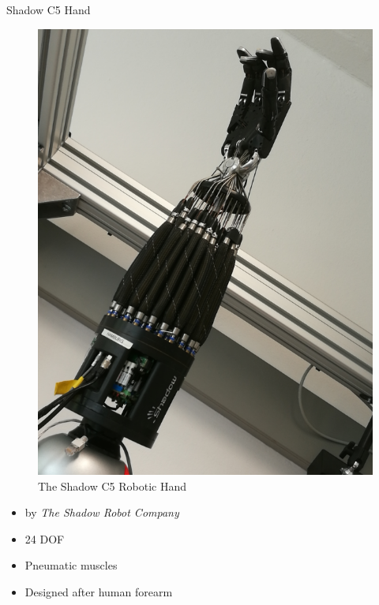 \documentclass[t]{beamer}
\begin{document}
\begin{frame}{Shadow C5 Hand}
\begin{minipage}{0.3\linewidth}
\begin{figure}
	\includegraphics[width=\linewidth]{assets/chpt_basics/hand.png}
	\caption{The Shadow C5 Robotic Hand}
\end{figure}
\end{minipage}
\begin{minipage}{0.68\linewidth}
	\begin{itemize}
		\item by \textit{The Shadow Robot Company} \cite{web:robothand:spec}
		\item 24 DOF
		\item Pneumatic muscles
		\item Designed after human forearm
	\end{itemize}
\end{minipage}
\end{frame}
\end{document}
